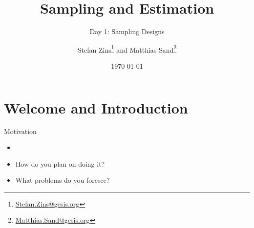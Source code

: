 \documentclass[10pt]{beamer}\usepackage[]{graphicx}\usepackage[]{color}
\newcommand\makebeamertitle{\frame{\maketitle}}%
\begin{document}
\title[Sampling Designs]{Sampling and Estimation}   
\subtitle{Day 1: Sampling Designs}

\author{Stefan Zins\thanks{\href{mailto:Stefan.Zins@gesis.org}{Stefan.Zins@gesis.org}} and Matthias Sand\thanks{\href{mailto:Matthias.Sand@gesis.org}{Matthias.Sand@gesis.org}}}
\date{\today} 

\makebeamertitle

\section{Welcome and Introduction}


\begin{frame}{Motivation}

  \begin{itemize}
    \item<1-2,3->  
         \vspace{1cm}
    \item<3-> How do you plan on doing it?  \vspace{1cm}
    \item<4>  What problems do you foresee?
  \end{itemize}
\end{frame}
\end{document}

